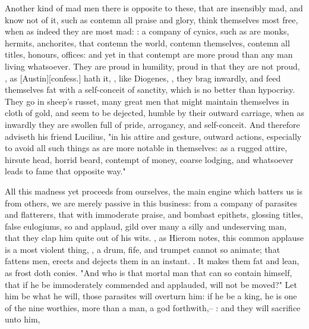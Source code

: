 Another kind of mad men there is opposite to these, that are insensibly mad,
and know not of it, such as contemn all praise and glory, think themselves most
free, when as indeed they are most mad: : a company
of cynics, such as are monks, hermits, anchorites, that contemn the world,
contemn themselves, contemn all titles, honours, offices: and yet in that
contempt are more proud than any man living whatsoever. They are proud in
humility, proud in that they are not proud, , as [Austin][\textlatin{confess.}] hath it, , like Diogenes, , they brag inwardly,
and feed themselves fat with a self-conceit of sanctity, which is no better
than hypocrisy. They go in sheep's russet, many great men that might maintain
themselves in cloth of gold, and seem to be dejected, humble by their outward
carriage, when as inwardly they are swollen full of pride, arrogancy, and
self-conceit. And therefore \Seneca{} adviseth his friend Lucilius,
"in his attire and gesture, outward actions, especially to
avoid all such things as are more notable in themselves: as a rugged attire,
hirsute head, horrid beard, contempt of money, coarse lodging, and whatsoever
leads to fame that opposite way."

All this madness yet proceeds from ourselves, the main engine which batters us
is from others, we are merely passive in this business: from a company of
parasites and flatterers, that with immoderate praise, and bombast epithets,
glossing titles, false eulogiums, so  and
applaud, gild over many a silly and undeserving man, that they clap him quite
out of his wits. , as Hierom notes, this common
applause is a most violent thing, , a drum, fife, and
trumpet cannot so animate; that fattens men, erects and dejects them in an
instant. .
It makes them fat and lean, as frost doth conies. "And who
is that mortal man that can so contain himself, that if he be immoderately
commended and applauded, will not be moved?" Let him be what he will, those
parasites will overturn him: if he be a king, he is one of the nine worthies,
more than a man, a god forthwith,-- : and they will sacrifice unto him,


